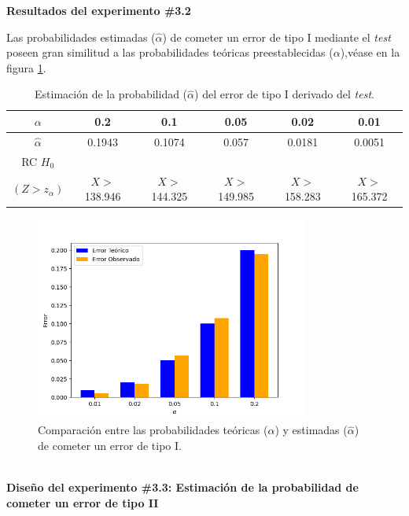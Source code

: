 \documentclass[12pt]{report}
\begin{document}
\textbf{Resultados del experimento \#3.2}

Las probabilidades estimadas ($\hat{\alpha}$) de cometer un error de tipo I  mediante el \textit{test} poseen gran similitud  a las probabilidades teóricas preestablecidas ($\alpha$),véase en la figura \ref{Teorico vs Observado3}.
\begin{table}[h!]
	\centering
	\begin{tabular}{|c|ccccc|}
		\hline
		$\alpha$ & 0.2 &   0.1 &  0.05 &  0.02 &  0.01 \\
		\hline
		$\hat{\alpha}$ & 0.1943 & 0.1074 & 0.057 & 0.0181 & 0.0051 \\
		\hline
	RC $H_0$ 		&		&		&		&		&\\
		$(Z>z_\alpha)$&  $X>$138.946& $X>$144.325& $X>$149.985& $X>$158.283& $X>$165.372\\	
		\hline
	\end{tabular}
	\caption{Estimación de la probabilidad ($\hat{\alpha}$) del error de tipo I derivado del \textit{test}.}
	\label{tab3:error1-prob1}
\end{table}
\begin{figure}[ht]
	\centering
	
	\includegraphics[width=0.8\textwidth]{5td_teo_obs.png}
	\caption{Comparación entre las probabilidades teóricas ($\alpha$) y estimadas ($\hat{\alpha}$) de cometer un error de tipo I. }
	\label{Teorico vs Observado3}
\end{figure}\\

\textbf{Diseño del experimento \#3.3: Estimación de la probabilidad de cometer un error de tipo II}
\end{document}
